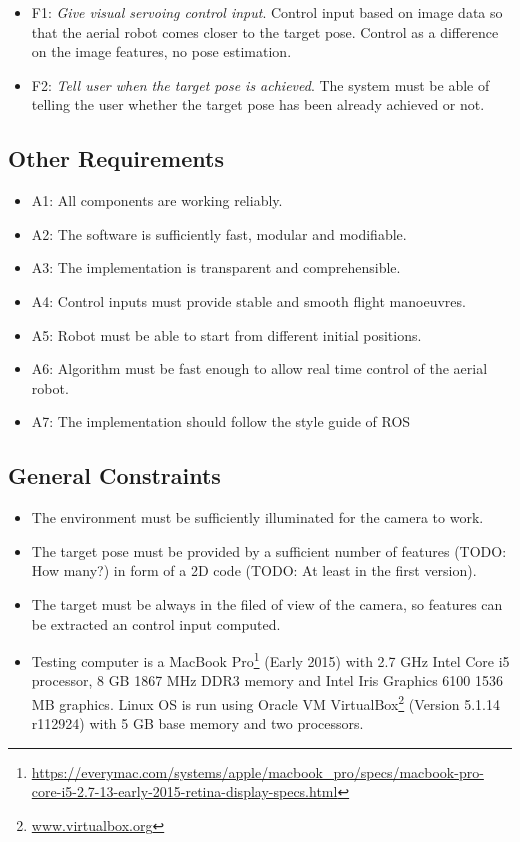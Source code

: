 \begin{itemize}
	\item F1: \emph{Give visual servoing control input}. Control input based on image data so that the aerial robot comes closer to the target pose. Control as a difference on the image features, no pose estimation.
	\item F2: \emph{Tell user when the target pose is achieved}. The system must be able of telling the user whether the target pose has been already achieved or not.
\end{itemize}

\subsection{Other Requirements}
\label{sec:other-requirements}

\begin{itemize}
	\item A1: All components are working reliably.
	\item A2: The software is sufficiently fast, modular and modifiable.
	\item A3: The implementation is transparent and comprehensible.
	\item A4: Control inputs must provide stable and smooth flight manoeuvres.
	\item A5: Robot must be able to start from different initial positions.
	\item A6: Algorithm must be fast enough to allow real time control of the aerial robot.
	\item A7: The implementation should follow the style guide of ROS\cite{ROS_Style}
\end{itemize}

\subsection{General Constraints}
\label{sec:general-constraints}

\begin{itemize}
	\item The environment must be sufficiently illuminated for the camera to work.
	\item The target pose must be provided by a sufficient number of features (TODO: How many?) in form of a 2D code (TODO: At least in the first
version).
	\item The target must be always in the filed of view of the camera, so features can be extracted an control input computed.
	\item Testing computer is a MacBook Pro\footnote{\url{https://everymac.com/systems/apple/macbook_pro/specs/macbook-pro-core-i5-2.7-13-early-2015-retina-display-specs.html}} (Early 2015) with 2.7 GHz Intel Core i5 processor, 8 GB 1867 MHz DDR3 memory and Intel Iris Graphics 6100 1536 MB graphics. Linux OS is run using Oracle VM VirtualBox\footnote{\url{www.virtualbox.org}} (Version 5.1.14 r112924) with 5 GB base memory and two processors.
\end{itemize}

